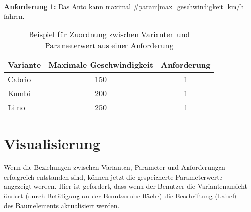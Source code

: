 \begin{center}
\textbf{Anforderung 1: }Das Auto kann maximal \#param[max\_geschwindigkeit] km/h fahren.
\end{center}

\begin{table}[h]
\begin{center}
	\begin{tabular}{|l||c|c|}
	 \hline
	 Variante &Maximale Geschwindigkeit &Anforderung\\
	 \hline\hline
	 Cabrio   &150                      & 1\\
	 \hline
	 Kombi    &200                      & 1\\
	 \hline
	 Limo     &250                      & 1\\
	 \hline
	\end{tabular}
	
	\caption{Beispiel für Zuordnung zwischen Varianten und Parameterwert aus einer Anforderung}
	\label{table:4TestCases}
\end{center}
\end{table}


\newpage
\section{Visualisierung}
\paragraph{}


Wenn die Beziehungen zwischen Varianten, Parameter und Anforderungen erfolgreich entstanden sind, können jetzt die gespeicherte Parameterwerte angezeigt werden. Hier ist gefordert, dass wenn der Benutzer die Variantenansicht ändert (durch Betätigung an der Benutzeroberfläche) die Beschriftung (Label) des Baumelements aktualisiert werden.\\

